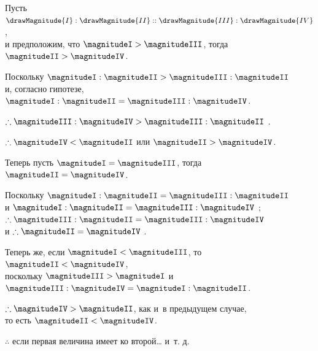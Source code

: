 \documentclass[letters,booklanguage=russian]{byrnebook}
\begin{document}
\begin{center}
Пусть $\drawMagnitude{I} : \drawMagnitude{II} :: \drawMagnitude{III} : \drawMagnitude{IV}$,\\
и предположим, что $\magnitudeI > \magnitudeIII$, тогда $\magnitudeII > \magnitudeIV$.

Поскольку $\magnitudeI : \magnitudeII > \magnitudeIII : \magnitudeII$ \\
и, согласно гипотезе, $\magnitudeI : \magnitudeII = \magnitudeIII : \magnitudeIV$.

$\therefore \magnitudeIII : \magnitudeIV > \magnitudeIII : \magnitudeII$ .

$\therefore \magnitudeIV < \magnitudeII$  или $\magnitudeII > \magnitudeIV$.

Теперь пусть $\magnitudeI = \magnitudeIII$, тогда $\magnitudeII = \magnitudeIV$.

Поскольку $\magnitudeI : \magnitudeII = \magnitudeIII : \magnitudeII$ \\
и $\magnitudeI : \magnitudeII = \magnitudeIII : \magnitudeIV$ \byref{\hypref};\\
$\therefore \magnitudeIII : \magnitudeII = \magnitudeIII : \magnitudeIV$ \\
и $\therefore \magnitudeII = \magnitudeIV$ .

Теперь же, если $\magnitudeI < \magnitudeIII$, то $\magnitudeII < \magnitudeIV$,\\
поскольку $\magnitudeIII > \magnitudeI$ и~$\magnitudeIII : \magnitudeIV = \magnitudeI : \magnitudeII$.

$\therefore \magnitudeIV > \magnitudeII$, как и~в предыдущем случае,\\
то есть $\magnitudeII < \magnitudeIV$.

$\therefore$ если первая величина имеет ко второй… и~т. д.
\end{center}

\vfill\pagebreak

\label{prop:V.XV}
\end{document}
